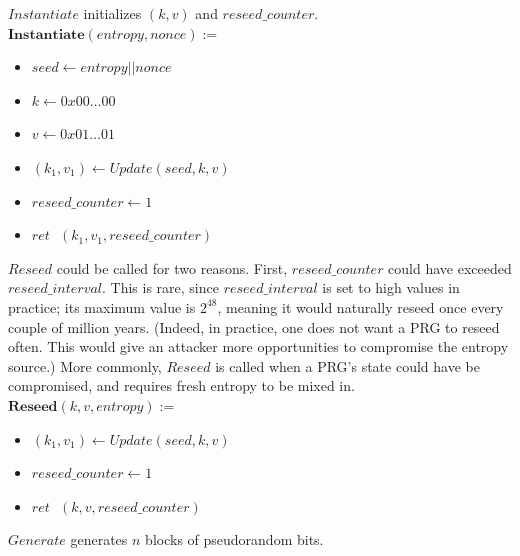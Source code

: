 \documentclass[12pt,lot, lof]{puthesis}
\newenvironment{game}
{ \begin{itemize}[noitemsep,nolistsep] 
}
{ \end{itemize}                  }
\newcommand{\s} {\textrm{ }}
\newcommand{\lar}{\leftarrow}
\begin{document}
$Instantiate$ initializes $(k,v)$ and $reseed\_counter$.  \\

$\textbf{Instantiate}(entropy, nonce) := $
\begin{game}
\item[] $seed \lar entropy || nonce$
\item[] $k \lar 0x00 \ldots 00$
\item[] $v \lar 0x01 \ldots 01$
\item[] $(k_1, v_1) \lar Update(seed, k, v)$
\item[] $reseed\_counter \lar 1$
\item[] $ret \s (k_1, v_1, reseed\_counter)$\\
\end{game}

$Reseed$ could be called for two reasons. First, $reseed\_counter$ could have exceeded $reseed\_interval$. This is rare, since $reseed\_interval$ is set to high values in practice; its maximum value is $2^{48}$, meaning it would naturally reseed once every couple of million years. (Indeed, in practice, one does not want a PRG to reseed often. This would give an attacker more opportunities to compromise the entropy source.) More commonly, $Reseed$ is called when a PRG's state could have be compromised, and requires fresh entropy to be mixed in.\\

$\textbf{Reseed}(k, v, entropy) := $
\begin{game}
\item[] $(k_1, v_1) \lar Update(seed, k, v)$
\item[] $reseed\_counter \lar 1$
\item[] $ret \s (k,v, reseed\_counter)$ \\
\end{game}

$Generate$ generates $n$ blocks of pseudorandom bits.\\

\end{document}
